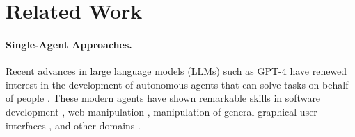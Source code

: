 \section{Related Work}


\paragraph{Single-Agent Approaches.} Recent advances in large language models (LLMs) such as GPT-4 \cite{openai2023gpt4} have renewed interest in the development of autonomous agents that can solve tasks on behalf of people \cite{russellnorvig1996, Wooldridge1995,Jennings1998Applications,wu2023autogen,yang2023autogptonlinedecisionmaking,sodhi2024stepstackedllmpolicies,zhang2024cognitivekernelopensourceagent,reed2022generalist}. These modern agents have shown remarkable skills in software development \cite{wang2024opendevinopenplatformai,zhang2024autocoderover,yang2024swe,xia2024agentless}, web manipulation \cite{deng2023mind2webgeneralistagentweb,zhang2024webpilotversatileautonomousmultiagent,zhou2024webarenarealisticwebenvironment,nakano2021webgpt,abuelsaad2024agenteautonomouswebnavigation}, manipulation of general graphical user interfaces \cite{zhang2024ufouifocusedagentwindows,wu2024oscopilotgeneralistcomputeragents,bonatti2024windowsagentarenaevaluating,pan2024autonomousevaluationrefinementdigital}, and other domains \cite{park2023generativeagentsinteractivesimulacra, Wang2023survey}. 



